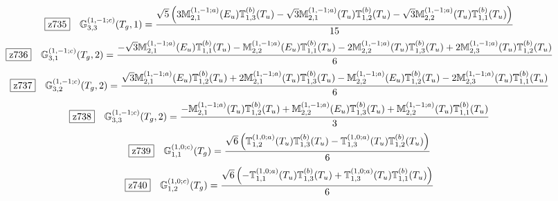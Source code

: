 \documentclass[fleqn,10pt,landscape]{jsarticle}
\begin{document}
\begin{dmath*}
\hspace*{3mm}\fbox{z735}\quad \mathbb{G}_{3,3}^{(1,-1;c)}(T_{g},1)=\frac{\sqrt{5} \left(3 \mathbb{M}_{2,1}^{(1,-1;a)}(E_{u}) \mathbb{T}_{1,3}^{(b)}(T_{u}) - \sqrt{3} \mathbb{M}_{2,1}^{(1,-1;a)}(T_{u}) \mathbb{T}_{1,2}^{(b)}(T_{u}) - \sqrt{3} \mathbb{M}_{2,2}^{(1,-1;a)}(T_{u}) \mathbb{T}_{1,1}^{(b)}(T_{u})\right)}{15}
\end{dmath*}
\begin{dmath*}
\hspace*{3mm}\fbox{z736}\quad \mathbb{G}_{3,1}^{(1,-1;c)}(T_{g},2)=\frac{- \sqrt{3} \mathbb{M}_{2,1}^{(1,-1;a)}(E_{u}) \mathbb{T}_{1,1}^{(b)}(T_{u}) - \mathbb{M}_{2,2}^{(1,-1;a)}(E_{u}) \mathbb{T}_{1,1}^{(b)}(T_{u}) - 2 \mathbb{M}_{2,2}^{(1,-1;a)}(T_{u}) \mathbb{T}_{1,3}^{(b)}(T_{u}) + 2 \mathbb{M}_{2,3}^{(1,-1;a)}(T_{u}) \mathbb{T}_{1,2}^{(b)}(T_{u})}{6}
\end{dmath*}
\begin{dmath*}
\hspace*{3mm}\fbox{z737}\quad \mathbb{G}_{3,2}^{(1,-1;c)}(T_{g},2)=\frac{\sqrt{3} \mathbb{M}_{2,1}^{(1,-1;a)}(E_{u}) \mathbb{T}_{1,2}^{(b)}(T_{u}) + 2 \mathbb{M}_{2,1}^{(1,-1;a)}(T_{u}) \mathbb{T}_{1,3}^{(b)}(T_{u}) - \mathbb{M}_{2,2}^{(1,-1;a)}(E_{u}) \mathbb{T}_{1,2}^{(b)}(T_{u}) - 2 \mathbb{M}_{2,3}^{(1,-1;a)}(T_{u}) \mathbb{T}_{1,1}^{(b)}(T_{u})}{6}
\end{dmath*}
\begin{dmath*}
\hspace*{3mm}\fbox{z738}\quad \mathbb{G}_{3,3}^{(1,-1;c)}(T_{g},2)=\frac{- \mathbb{M}_{2,1}^{(1,-1;a)}(T_{u}) \mathbb{T}_{1,2}^{(b)}(T_{u}) + \mathbb{M}_{2,2}^{(1,-1;a)}(E_{u}) \mathbb{T}_{1,3}^{(b)}(T_{u}) + \mathbb{M}_{2,2}^{(1,-1;a)}(T_{u}) \mathbb{T}_{1,1}^{(b)}(T_{u})}{3}
\end{dmath*}
\begin{dmath*}
\hspace*{3mm}\fbox{z739}\quad \mathbb{G}_{1,1}^{(1,0;c)}(T_{g})=\frac{\sqrt{6} \left(\mathbb{T}_{1,2}^{(1,0;a)}(T_{u}) \mathbb{T}_{1,3}^{(b)}(T_{u}) - \mathbb{T}_{1,3}^{(1,0;a)}(T_{u}) \mathbb{T}_{1,2}^{(b)}(T_{u})\right)}{6}
\end{dmath*}
\begin{dmath*}
\hspace*{3mm}\fbox{z740}\quad \mathbb{G}_{1,2}^{(1,0;c)}(T_{g})=\frac{\sqrt{6} \left(- \mathbb{T}_{1,1}^{(1,0;a)}(T_{u}) \mathbb{T}_{1,3}^{(b)}(T_{u}) + \mathbb{T}_{1,3}^{(1,0;a)}(T_{u}) \mathbb{T}_{1,1}^{(b)}(T_{u})\right)}{6}
\end{dmath*}
\end{document}

